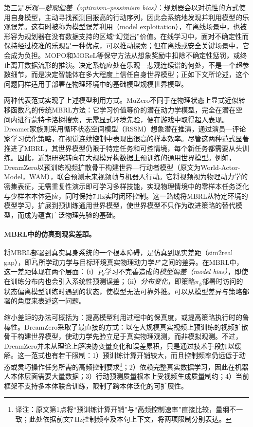 第三是\emph{乐观—悲观偏差（optimism--pessimism bias）}：规划器会以对抗性的方式使用自身模型，主动寻找预测回报高的行动序列，因此会系统地发现并利用模型的乐观误差。这有时被称为模型误差利用（model exploitation），在离线场景中，也被形容为规划器在没有数据支持的区域“幻觉出”价值。在线学习中，面对不确定性而保持经过校准的乐观是一种优点，可以推动探索\citep{curi2020hucrl}；但在离线或安全关键场景中，它会成为负担。MOPO和MOReL等保守方法从想象奖励中扣除不确定性惩罚，或终止离开数据流形的推演\citep{yu2020mopo,kidambi2020morel}。决定系统应处在乐观—悲观连续谱的何处，不是一个超参数细节，而是决定智能体在多大程度上信任自身世界模型；正如下文所论述，这个问题同样适用于部署在物理环境中的基础模型规模世界模型。

两种代表范式实现了上述模型利用方式。MuZero\citep{schrittwieser2020muzero}不同于在物理状态上显式近似转移函数$\widehat P_\theta$的传统MBRL方法：它学习价值等价的潜在动力学模型，完全在潜在空间内进行蒙特卡洛树搜索，无需显式环境先验，便在游戏中取得超人表现。Dreamer家族\citep{hafner2019dreamer,hafner2020dreamerv2,hafner2023dreamerv3}则采用循环状态空间模型（RSSM）想象潜在推演，通过演员—评论家学习优化策略，在视觉连续控制中表现出很高的样本效率。尽管这两种范式显著推进了MBRL，其世界模型仍限于特定任务和可控情境，每个新任务都需要从头训练。因此，近期研究转向在大规模异构数据上预训练的通用世界模型。例如，DreamZero\citep{ye2026dreamzero}以预训练视频扩散骨干构建世界—行动者模型（原文为World-Actor-Model，WAM），联合预测未来视频帧与机器人行动。它将视频视为物理动力学的密集表征，无需重复性演示即可学习多样技能，实现物理情境中的零样本任务泛化与少样本本体适应，同时保持7\,Hz实时闭环控制。这一路线将MBRL从特定环境的模型学习，扩展到预训练通用世界模型，使世界模型不只作为改进策略的替代模型，而成为蕴含广泛物理先验的基础。

\paragraph{MBRL中的仿真到现实差距。}
将MBRL部署到真实具身系统的一个根本障碍，是仿真到现实差距（sim2real gap），即$\widehat P_\theta$所学动力学与目标环境真实物理动力学$P^\star$之间的差异。在MBRL中，这一差距体现在两个层面：（i）$\widehat P_\theta$学习不完善造成的\textit{模型偏差（model bias）}，即使在训练分布内也会引入系统性预测误差；（ii）\textit{分布变化}，即策略$\pi_\phi$部署时访问的状态偏离模型训练时遇到的状态，使模型无法可靠外推\citep{janner2019mbpo,ross2011dagger}。可以从模型差异与策略部署的角度来表述这一问题。

缩小差距的办法可概括为：提高模型利用过程中的保真度，或提高策略执行时的鲁棒性。DreamZero\citep{ye2026dreamzero}采取了最直接的方式：以在大规模真实视频上预训练的视频扩散骨干构建世界模型，使动力学先验立足于真实物理观测，而非模拟观测。不过，DreamZero并未从理论上解决协变量变化和误差累积，只是通过技术手段加以缓解。这一范式也有若干限制：1）预训练计算开销较大，而且控制频率仍远低于动态或灵巧操作任务所需的高频控制要求\footnote{译注：原文第1点将“预训练计算开销”与“高频控制速率”直接比较，量纲不一致；此处依据前文7\,Hz控制频率及本句上下文，将两项限制分别表达。}；2）依赖完整真实数据学习，因此在机器人本体层面需要大量数据；3）行动预测质量根本上受视频生成质量制约；4）当前框架不支持多本体联合训练，限制了跨本体泛化的可扩展性。


